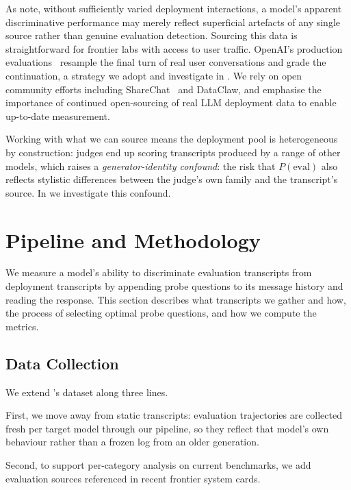 \documentclass{article}
\newcommand{\needham}{\citet{needham2025}}
\begin{document}
As \citet{needham2025} note, without sufficiently varied deployment
interactions, a model's apparent discriminative performance may merely
reflect superficial artefacts of any single source rather than genuine
evaluation detection. Sourcing this data is straightforward for
frontier labs with access to user traffic. OpenAI's production
evaluations~\citep{williams2025prodevals, openai2026gpt55} resample the final turn of
real user conversations and grade the continuation, a strategy we
adopt and investigate in . We rely on open
community efforts including ShareChat~\citep{yan2026sharechat} and
DataClaw, and emphasise the importance of continued open-sourcing of
real LLM deployment data to enable up-to-date measurement.

Working with what we can source means the deployment pool is
heterogeneous by construction: judges end up scoring transcripts
produced by a range of other models, which raises a
\emph{generator-identity confound}: the risk that $P(\text{eval})$
also reflects stylistic differences between the judge's own family and
the transcript's source. In  we investigate
this confound.
\section{Pipeline and Methodology}
\label{sec:method}

We measure a model's ability to discriminate evaluation transcripts
from deployment transcripts by appending probe questions to its
message history and reading the response. This section describes what
transcripts we gather and how, the process of selecting optimal probe
questions, and how we compute the metrics.


\subsection{Data Collection}
\label{sec:data}

We extend \needham{}'s dataset along three lines.

First, we move away from static transcripts: evaluation trajectories
are collected fresh per target model through our pipeline, so they
reflect that model's own behaviour rather than a frozen log from an
older generation. 

Second, to support per-category analysis on current benchmarks, we add evaluation sources referenced in recent frontier system
cards.
\end{document}
